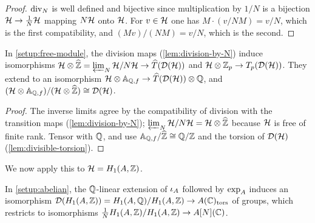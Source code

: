 \begin{proof}
$\mathrm{div}_{N}$ is well defined and bijective since multiplication by
$1/N$ is a bijection $\mathcal{H} \to \tfrac{1}{N}\mathcal{H}$ mapping
$N\mathcal{H}$ onto $\mathcal{H}$. For $v \in \mathcal{H}$ one has
$M\cdot(v/NM) = v/N$, which is the first compatibility, and
$(Mv)/(NM) = v/N$, which is the second.
\end{proof}

\begin{corollary}
\label{cor:abstract-tate}
In \cref{setup:free-module}, the division maps (\cref{lem:division-by-N})
induce isomorphisms
$\mathcal{H}\otimes\widehat{\mathbb{Z}} = \varprojlim_N\mathcal{H}/N\mathcal{H}
\to \widehat{T}(\mathcal{D}(\mathcal{H}))$ and
$\mathcal{H}\otimes\mathbb{Z}_{p} \to T_{p}(\mathcal{D}(\mathcal{H}))$. They
extend to an isomorphism
$\mathcal{H}\otimes\mathbb{A}_{\mathbb{Q},f} \to \widehat{T}(\mathcal{D}(\mathcal{H}))\otimes\mathbb{Q}$,
and $(\mathcal{H}\otimes\mathbb{A}_{\mathbb{Q},f})/(\mathcal{H}\otimes\widehat{\mathbb{Z}})
\cong \mathcal{D}(\mathcal{H})$.
\end{corollary}

\begin{proof}
The inverse limits agree by the compatibility of division with the
transition maps (\cref{lem:division-by-N}); $\varprojlim_N \mathcal{H}/N\mathcal{H}
= \mathcal{H}\otimes\widehat{\mathbb{Z}}$ because $\mathcal{H}$ is free of finite
rank. Tensor with $\mathbb{Q}$, and use
$\mathbb{A}_{\mathbb{Q},f}/\widehat{\mathbb{Z}} \cong \mathbb{Q}/\mathbb{Z}$ and the torsion of
$\mathcal{D}(\mathcal{H})$ (\cref{lem:divisible-torsion}).
\end{proof}

We now apply this to $\mathcal{H} = H_{1}(A,\mathbb{Z})$.

\begin{lemma}
\label{lem:torsion-points}
In \cref{setup:abelian}, the $\mathbb{Q}$-linear extension of $\iota_{A}$
followed by $\exp_{A}$ induces an isomorphism
$\mathcal{D}(H_{1}(A,\mathbb{Z})) = H_{1}(A,\mathbb{Q})/H_{1}(A,\mathbb{Z})
\to A(\mathbb{C})_{\mathrm{tors}}$ of groups, which restricts to isomorphisms
$\tfrac{1}{N}H_{1}(A,\mathbb{Z})/H_{1}(A,\mathbb{Z}) \to A[N](\mathbb{C})$.
\end{lemma}

